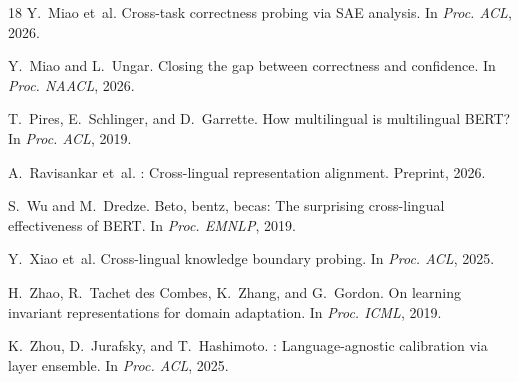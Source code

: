 \documentclass[11pt,a4paper]{article}
\begin{document}
\begin{thebibliography}{18}
Y.~Miao et~al.
\newblock Cross-task correctness probing via SAE analysis.
\newblock In {\em Proc. ACL}, 2026.

Y.~Miao and L.~Ungar.
\newblock Closing the gap between correctness and confidence.
\newblock In {\em Proc. NAACL}, 2026.

T.~Pires, E.~Schlinger, and D.~Garrette.
\newblock How multilingual is multilingual {BERT}?
\newblock In {\em Proc. ACL}, 2019.

A.~Ravisankar et~al.
: Cross-lingual representation alignment.
\newblock Preprint, 2026.

S.~Wu and M.~Dredze.
\newblock Beto, bentz, becas: The surprising cross-lingual effectiveness of {BERT}.
\newblock In {\em Proc. EMNLP}, 2019.

Y.~Xiao et~al.
\newblock Cross-lingual knowledge boundary probing.
\newblock In {\em Proc. ACL}, 2025.

H.~Zhao, R.~Tachet des Combes, K.~Zhang, and G.~Gordon.
\newblock On learning invariant representations for domain adaptation.
\newblock In {\em Proc. ICML}, 2019.

K.~Zhou, D.~Jurafsky, and T.~Hashimoto.
: Language-agnostic calibration via layer ensemble.
\newblock In {\em Proc. ACL}, 2025.

\end{thebibliography}
\end{document}
